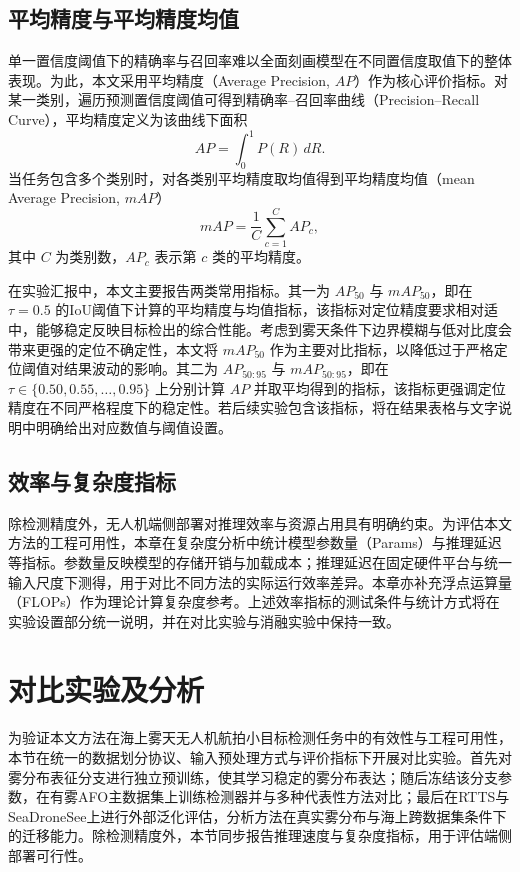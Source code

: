 \subsection{平均精度与平均精度均值}

单一置信度阈值下的精确率与召回率难以全面刻画模型在不同置信度取值下的整体表现。为此，本文采用平均精度（Average Precision, $AP$）作为核心评价指标。对某一类别，遍历预测置信度阈值可得到精确率--召回率曲线（Precision--Recall Curve），平均精度定义为该曲线下面积
\begin{equation}
AP=\int_{0}^{1} P(R)\, dR.
\end{equation}
当任务包含多个类别时，对各类别平均精度取均值得到平均精度均值（mean Average Precision, $mAP$）
\begin{equation}
mAP=\frac{1}{C}\sum_{c=1}^{C} AP_c,
\end{equation}
其中 $C$ 为类别数，$AP_c$ 表示第 $c$ 类的平均精度。

在实验汇报中，本文主要报告两类常用指标。其一为 $AP_{50}$ 与 $mAP_{50}$，即在 $\tau=0.5$ 的IoU阈值下计算的平均精度与均值指标，该指标对定位精度要求相对适中，能够稳定反映目标检出的综合性能。考虑到雾天条件下边界模糊与低对比度会带来更强的定位不确定性，本文将 $mAP_{50}$ 作为主要对比指标，以降低过于严格定位阈值对结果波动的影响。其二为 $AP_{50:95}$ 与 $mAP_{50:95}$，即在 $\tau\in\{0.50,0.55,\ldots,0.95\}$ 上分别计算 $AP$ 并取平均得到的指标，该指标更强调定位精度在不同严格程度下的稳定性。若后续实验包含该指标，将在结果表格与文字说明中明确给出对应数值与阈值设置。


\subsection{效率与复杂度指标}

除检测精度外，无人机端侧部署对推理效率与资源占用具有明确约束。为评估本文方法的工程可用性，本章在复杂度分析中统计模型参数量（Params）与推理延迟等指标。参数量反映模型的存储开销与加载成本；推理延迟在固定硬件平台与统一输入尺度下测得，用于对比不同方法的实际运行效率差异。本章亦补充浮点运算量（FLOPs）作为理论计算复杂度参考。上述效率指标的测试条件与统计方式将在实验设置部分统一说明，并在对比实验与消融实验中保持一致。



\section{对比实验及分析}
\label{sec:comparison}

为验证本文方法在海上雾天无人机航拍小目标检测任务中的有效性与工程可用性，本节在统一的数据划分协议、输入预处理方式与评价指标下开展对比实验。首先对雾分布表征分支进行独立预训练，使其学习稳定的雾分布表达；随后冻结该分支参数，在有雾AFO主数据集上训练检测器并与多种代表性方法对比；最后在RTTS与SeaDroneSee上进行外部泛化评估，分析方法在真实雾分布与海上跨数据集条件下的迁移能力。除检测精度外，本节同步报告推理速度与复杂度指标，用于评估端侧部署可行性。

